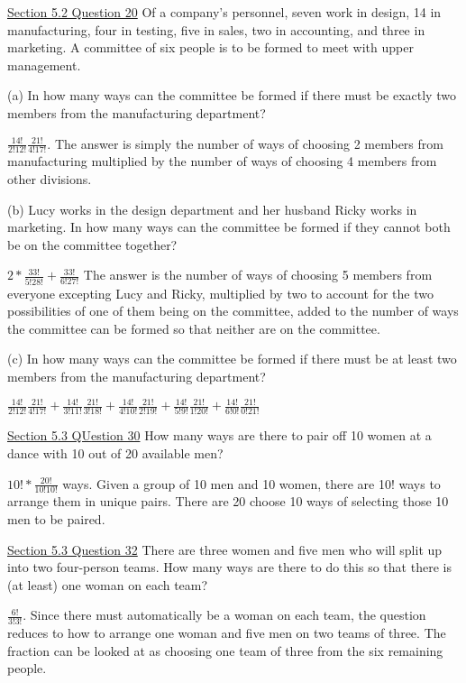 \documentclass{article}
\begin{document}
\underline{Section 5.2 Question 20}\newline{}
Of a company’s personnel, seven work in design, 14 in manufacturing, four in
testing, five in sales, two in accounting, and three in marketing. A committee of
six people is to be formed to meet with upper management.\newline{}

(a) In how many ways can the committee be formed if there must be exactly
two members from the manufacturing department?\newline{}

$\frac{14!}{2!12!}\frac{21!}{4!17!}$. The answer is simply the number of ways of choosing 2 members from manufacturing multiplied by the number of ways of choosing 4 members from other divisions.\newline{}

(b) Lucy works in the design department and her husband Ricky works in
marketing. In how many ways can the committee be formed if they cannot
both be on the committee together?\newline{}

$2*\frac{33!}{5!28!}+\frac{33!}{6!27!}$ The answer is the number of ways of choosing 5 members from everyone excepting Lucy and Ricky, multiplied by two to account for the two possibilities of one of them being on the committee, added to the number of ways the committee can be formed so that neither are on the committee.\newline{}

(c) In how many ways can the committee be formed if there must be at least
two members from the manufacturing department?\newline{}

$\frac{14!}{2!12!}\frac{21!}{4!17!}+\frac{14!}{3!11!}\frac{21!}{3!18!}+\frac{14!}{4!10!}\frac{21!}{2!19!}+\frac{14!}{5!9!}\frac{21!}{1!20!}+\frac{14!}{6!0!}\frac{21!}{0!21!}$\newline{}

\underline{Section 5.3 QUestion 30}\newline{}
How many ways are there to pair off 10 women at a dance with 10 out of 20
available men?\newline{}

$10!*\frac{20!}{10!10!}$ ways. Given a group of 10 men and 10 women, there are 10! ways to arrange them in unique pairs. There are 20 choose 10 ways of selecting those 10 men to be paired.\newline{}

\underline{Section 5.3 Question 32}
There are three women and five men who will split up into two four-person
teams. How many ways are there to do this so that there is (at least) one woman
on each team?\newline{}

$\frac{6!}{3!3!}$. Since there must automatically be a woman on each team, the question reduces to how to arrange one woman and five men on two teams of three. The fraction can be looked at as choosing one team of three from the six remaining people.
\end{document}

